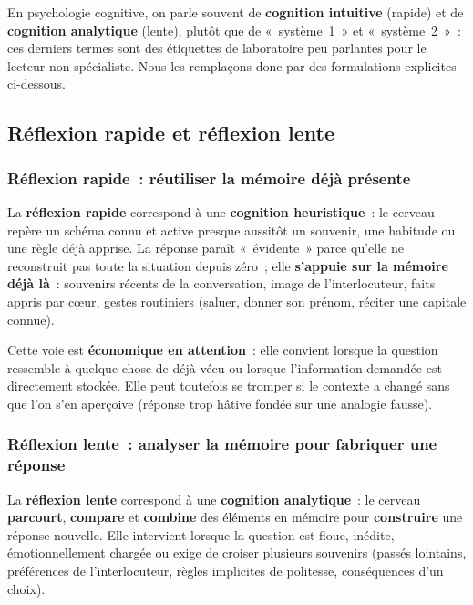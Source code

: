 \documentclass[a4paper,12pt]{report}
\begin{document}
	En psychologie cognitive, on parle souvent de \textbf{cognition intuitive} (rapide) et de
	\textbf{cognition analytique} (lente), plutôt que de «~système~1~» et «~système~2~»~:
	ces derniers termes sont des étiquettes de laboratoire peu parlantes pour le lecteur
	non spécialiste. Nous les remplaçons donc par des formulations explicites ci-dessous.
	
	\subsection{Réflexion rapide et réflexion lente}
	
	\subsubsection{Réflexion rapide~: réutiliser la mémoire déjà présente}
	
	La \textbf{réflexion rapide} correspond à une \textbf{cognition heuristique}~: le cerveau
	repère un schéma connu et active presque aussitôt un souvenir, une habitude ou une
	règle déjà apprise. La réponse paraît «~évidente~» parce qu'elle ne reconstruit pas
	toute la situation depuis zéro~; elle \textbf{s'appuie sur la mémoire déjà là}~:
	souvenirs récents de la conversation, image de l'interlocuteur, faits appris par cœur,
	gestes routiniers (saluer, donner son prénom, réciter une capitale connue).
	
	Cette voie est \textbf{économique en attention}~: elle convient lorsque la question
	ressemble à quelque chose de déjà vécu ou lorsque l'information demandée est
	directement stockée. Elle peut toutefois se tromper si le contexte a changé sans que
	l'on s'en aperçoive (réponse trop hâtive fondée sur une analogie fausse).
	
	\subsubsection{Réflexion lente~: analyser la mémoire pour fabriquer une réponse}
	
	La \textbf{réflexion lente} correspond à une \textbf{cognition analytique}~: le cerveau
	\textbf{parcourt}, \textbf{compare} et \textbf{combine} des éléments en mémoire pour
	\textbf{construire} une réponse nouvelle. Elle intervient lorsque la question est
	floue, inédite, émotionnellement chargée ou exige de croiser plusieurs souvenirs
	(passés lointains, préférences de l'interlocuteur, règles implicites de politesse,
	conséquences d'un choix).
	
\end{document}
